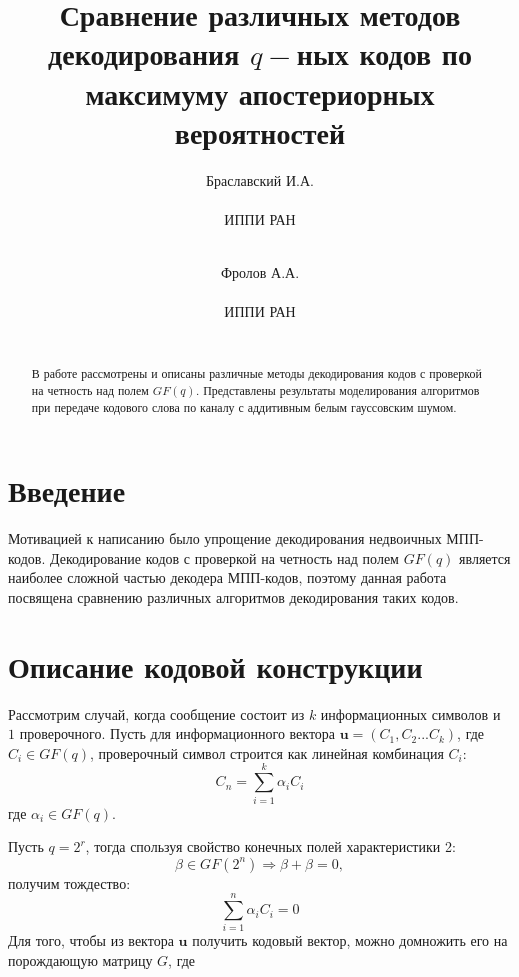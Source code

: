\documentclass{ITaSconf}
\begin{document}
\title{Сравнение различных методов декодирования $q-$ных кодов по максимуму апостериорных вероятностей}

\author{
Браславский И.А.\\
 \begin{affiliation}
    ИППИ РАН
  \end{affiliation}\\
\and
Фролов А.А.\\
 \begin{affiliation}
    ИППИ РАН
  \end{affiliation}\\
}


\maketitle

\begin{abstract}
  
В работе рассмотрены  и описаны различные методы декодирования кодов с проверкой на четность над полем $GF(q)$. Представлены результаты моделирования  алгоритмов при передаче кодового слова по каналу с аддитивным белым гауссовским шумом. 
\end{abstract} 

\section{Введение}
Мотивацией к написанию было упрощение декодирования недвоичных МПП-кодов.
Декодирование кодов с проверкой на четность над полем $GF(q)$ является наиболее сложной частью декодера МПП-кодов, поэтому данная работа посвящена сравнению различных алгоритмов декодирования таких кодов.
\label{sec:introduct}

\section{Описание кодовой конструкции}
\label{sec:opisanie}

Рассмотрим случай, когда сообщение состоит из $k$ информационных символов и $1$ проверочного. Пусть для информационного вектора $\mathbold{u}=(C_1,C_2...C_k)$, где $ C_i \in GF(q) $, проверочный символ строится как линейная комбинация $C_i$: 
$$C_n=\sum_{i=1}^k \alpha_i C_i$$
где $\alpha_i \in GF(q)$.

Пусть $q=2^r$, тогда спользуя свойство конечных полей характеристики 2: 
$$\beta \in GF(2^n)\Rightarrow\beta+\beta=0,$$ 
получим тождество: 
$$\sum_{i=1}^n \alpha_i C_i=0$$ 
Для того, чтобы из вектора $\mathbold{u}$ получить кодовый вектор, можно домножить его на порождающую матрицу $G$, где 
\end{document}
